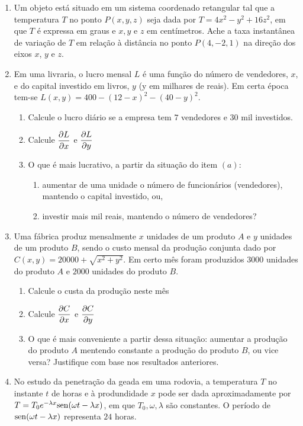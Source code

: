 \documentclass[oneside,a4paper,12pt]{article}
\newcommand{\sen}{{\rm sen}}
\begin{document}
\begin{enumerate}
    \item Um objeto está situado em um sistema coordenado retangular tal que a temperatura $T$ no ponto $P(x,y,z)$ seja dada por $T=4x^2-y^2+16z^2$, em que $T$ é expressa em graus e $x,y$ e $z$ em centímetros. Ache a taxa instantânea de variação de $T$ em relação à distância no ponto $P(4,-2,1)$ na direção dos eixos $x$, $y$ e $z$.
    \item Em uma livraria, o lucro mensal $L$ é uma função do número de vendedores, $x$, e do capital investido em livros, $y$ (y em milhares de reais). Em certa época tem-se $L(x,y) = 400 - (12-x)^2-(40-y)^2$.
        \begin{enumerate}
            \item Calcule o lucro diário se a empresa tem $7$ vendedores e $30$ mil investidos.
            \item Calcule $\displaystyle \pdv{L}{x}(7,30)$ e $\displaystyle \pdv{L}{y}(7,30)$
            \item O que é mais lucrativo, a partir da situação do item $(a)$:
                \begin{enumerate}
                    \item aumentar de uma unidade o número de funcionários (vendedores), mantendo o capital investido, ou,
                    \item investir mais mil reais, mantendo o número de vendedores?
                \end{enumerate}
        \end{enumerate}
    \item Uma fábrica produz mensalmente $x$ unidades de um produto $A$ e $y$ unidades de um produto $B$, sendo o custo mensal da produção conjunta dado por $C(x,y) = 20000 + \sqrt{x^2+y^2}$. Em certo mês foram produzidos $3000$ unidades do produto $A$ e $2000$ unidades do produto $B$.
        \begin{enumerate}
            \item Calcule o custa da produção neste mês
            \item Calcule $\displaystyle \pdv{C}{x}$ e $\displaystyle \pdv{C}{y}$
            \item O que é mais conveniente a partir dessa situação: aumentar a produção do produto $A$ mentendo constante a produção do produto $B$, ou vice versa? Justifique com base nos resultados anteriores.
        \end{enumerate}
    \item No estudo da penetração da geada em uma rodovia, a temperatura $T$ no instante $t$ de horas e à produndidade $x$ pode ser dada aproximadamente por $T = T_0e^{-\lambda x}\sen(\omega t - \lambda x)$, em que $T_0, \omega, \lambda$ são constantes. O período de $\sen(\omega t - \lambda x)$ representa $24$ horas.

\end{enumerate}
\end{document}
